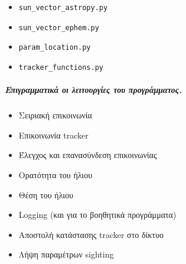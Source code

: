 \documentclass[
  a4paper,
  twoside,
  titlepage,
  11pt]{article}
\providecommand{\tightlist}{%
  \setlength{\itemsep}{0pt}\setlength{\parskip}{0pt}}
\numberwithin{equation}{section}
\numberwithin{figure}{section}
\numberwithin{table}{section}
\begin{document}
\begin{itemize}
\tightlist
\item
  \texttt{sun\_vector\_astropy.py}
\item
  \texttt{sun\_vector\_ephem.py}
\item
  \texttt{param\_location.py}
\item
  \texttt{tracker\_functions.py}
\end{itemize}

\hypertarget{ux3b5ux3c0ux3b9ux3b3ux3c1ux3b1ux3bcux3bcux3b1ux3c4ux3b9ux3baux3ac-ux3bfux3b9-ux3bbux3b5ux3b9ux3c4ux3bfux3c5ux3c1ux3b3ux3afux3b5ux3c2-ux3c4ux3bfux3c5-ux3c0ux3c1ux3bfux3b3ux3c1ux3acux3bcux3bcux3b1ux3c4ux3bfux3c2.}{%
\subparagraph{Επιγραμματικά οι λειτουργίες του προγράμματος.}\label{ux3b5ux3c0ux3b9ux3b3ux3c1ux3b1ux3bcux3bcux3b1ux3c4ux3b9ux3baux3ac-ux3bfux3b9-ux3bbux3b5ux3b9ux3c4ux3bfux3c5ux3c1ux3b3ux3afux3b5ux3c2-ux3c4ux3bfux3c5-ux3c0ux3c1ux3bfux3b3ux3c1ux3acux3bcux3bcux3b1ux3c4ux3bfux3c2.}}

\begin{itemize}
\tightlist
\item
  Σειριακή επικοινωνία
\item
  Επικοινωνία tracker
\item
  Έλεγχος και επανασύνδεση επικοινωνίας
\item
  Ορατότητα του ήλιου
\item
  Θέση του ήλιου
\item
  Logging (και για το βοηθητικά προγράμματα)
\item
  Αποστολή κατάστασης tracker στο δίκτυο
\item
  Λήψη παραμέτρων sighting
\end{itemize}
\end{document}
